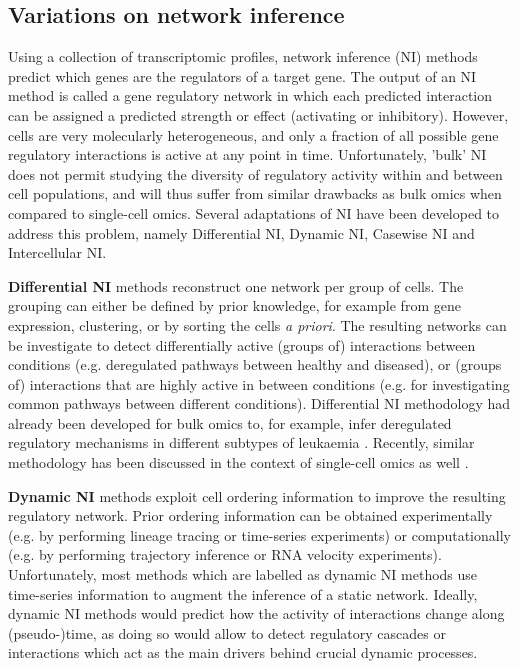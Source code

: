 \subsection{Variations on network inference}
Using a collection of transcriptomic profiles, network inference (NI) methods predict which genes are the regulators of a target gene. The output of an NI method is called a gene regulatory network in which each predicted interaction can be assigned a predicted strength or effect (activating or inhibitory).
However, cells are very molecularly heterogeneous, and only a fraction of all possible gene regulatory interactions is active at any point in time. Unfortunately, 'bulk' NI does not permit studying the diversity of regulatory activity within and between cell populations, and will thus suffer from similar drawbacks as bulk omics when compared to single-cell omics. Several adaptations of NI have been developed to address this problem, namely Differential NI, Dynamic NI, Casewise NI and Intercellular NI. 

\textbf{Differential NI} methods reconstruct one network per group of cells. The grouping can either be defined by prior knowledge, for example from gene expression, clustering, or by sorting the cells \textit{a priori}. 
The resulting networks can be investigate to detect differentially active (groups of) interactions between conditions (e.g. deregulated pathways between healthy and diseased), or (groups of) interactions that are highly active in between conditions (e.g. for investigating common pathways between different conditions). Differential NI methodology had already been developed for bulk omics \cite{ideker_differentialnetworkbiology_2012} to, for example, infer deregulated regulatory mechanisms in different subtypes of leukaemia \cite{gill_differentialnetworkanalysis_2014}.
Recently, similar methodology has been discussed in the context of single-cell omics as well \cite{chiu_scdnetcomputationaltool_2018}.

\textbf{Dynamic NI} methods exploit cell ordering information to improve the resulting regulatory network. Prior ordering information can be obtained experimentally (e.g. by performing lineage tracing or time-series experiments) or computationally (e.g. by performing trajectory inference or RNA velocity experiments). Unfortunately, most methods which are labelled as dynamic NI methods use time-series information to augment the inference of a static network. Ideally, dynamic NI methods would predict how the activity of interactions change along (pseudo-)time, as doing so would allow to detect regulatory cascades or interactions which act as the main drivers behind crucial dynamic processes.

